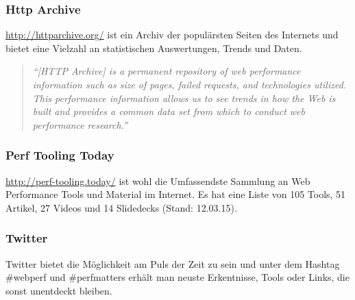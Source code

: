		\subsubsection{Http Archive} %
		\label{ssub:http_archive_bigqueri_es}
			\url{http://httparchive.org/} ist ein Archiv der populärsten Seiten des Internets und bietet eine Vielzahl an statistischen Auswertungen, Trends und Daten.
			\begin{quote}
				\textit{"`[HTTP Archive] is a permanent repository of web performance information such as size of pages, failed requests, and technologies utilized. This performance information allows us to see trends in how the Web is built and provides a common data set from which to conduct web performance research."' \autocite{httpArchiveMission}}
			\end{quote}
			

		\subsubsection{Perf Tooling Today} %
		\label{ssub:perf_tooling_today}
			\url{http://perf-tooling.today/} ist wohl die Umfassendste Sammlung an Web Performance Tools und Material im Internet. Es hat eine Liste von 105 Tools, 51 Artikel, 27 Videos und 14 Slidedecks (Stand: 12.03.15).
		

		\subsubsection{Twitter} %
		\label{ssub:twitter}
			Twitter bietet die Möglichkeit am Puls der Zeit zu sein und unter dem Hashtag \#webperf und \#perfmatters erhält man neuste Erkentnisse, Tools oder Links, die sonst unentdeckt bleiben.
		
	\pagebreak


